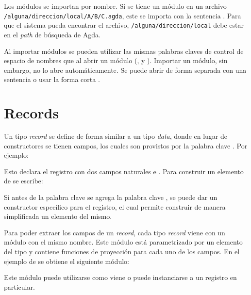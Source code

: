 Los módulos se importan por nombre. Si se tiene un módulo  en un archivo \texttt{/alguna/direccion/local/A/B/C.agda}, este se importa con la sentencia  . Para que el sistema pueda encontrar el archivo, \texttt{/alguna/direccion/local} debe estar en el \textit{path} de búsqueda de Agda. 

Al importar módulos se pueden utilizar las mismas palabras claves de control de espacio de nombres que al abrir un módulo (,  y ). Importar un módulo, sin embargo, no lo abre automáticamente. Se puede abrir de forma separada con una sentencia  o usar la forma corta  .

\section{Records}

Un tipo \textit{record} se define de forma similar a un tipo \textit{data}, donde en lugar de constructores se tienen campos, los cuales son provistos por la palabra clave . Por ejemplo: 


Esto declara el registro  con dos campos naturales  e . Para construir un elemento de  se escribe:


Si antes de la palabra clave  se agrega la palabra clave , se puede dar un constructor específico para el registro, el cual permite construir de manera simplificada un elemento del mismo. 


Para poder extraer los campos de un \textit{record}, cada tipo \textit{record} viene con un módulo con el mismo nombre. Este módulo está parametrizado por un elemento del tipo y contiene funciones de proyección para cada uno de los campos. En el ejemplo de  se obtiene el siguiente módulo:


Este módulo puede utilizarse como viene o puede instanciarse a un registro en particular. 



